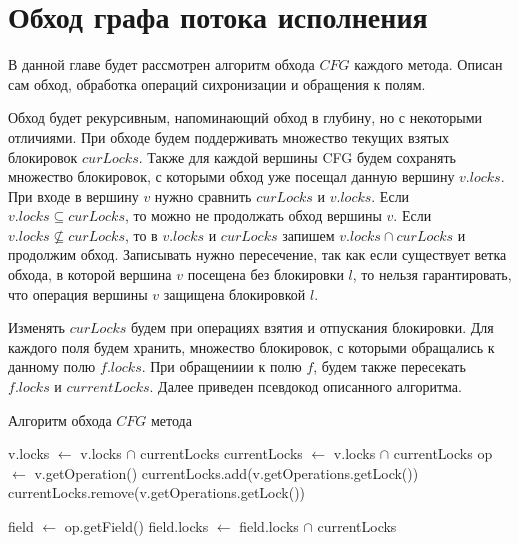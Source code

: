 \section{Обход графа потока исполнения}
В данной главе будет рассмотрен алгоритм обхода $CFG$ каждого метода. Описан сам обход, обработка операций сихронизации и обращения к полям. 

Обход будет рекурсивным, напоминающий обход в глубину, но с некоторыми отличиями. При обходе будем поддерживать множество текущих взятых блокировок $curLocks$. Также для каждой вершины CFG будем сохранять множество блокировок, с которыми обход уже посещал данную вершину $v.locks$.
При входе в вершину $v$ нужно сравнить $curLocks$ и $v.locks$. Если $v.locks \subseteq curLocks$, то можно не продолжать обход вершины $v$. Если $v.locks \nsubseteq curLocks$, то в $v.locks$ и $curLocks$ запишем  $v.locks \cap curLocks$ и продолжим обход. Записывать нужно пересечение, так как если существует ветка обхода, в которой вершина $v$ посещена без блокировки $l$, то нельзя гарантировать, что операция вершины $v$ защищена блокировкой $l$. 

Изменять $curLocks$ будем при операциях взятия и отпускания блокировки. Для каждого поля будем хранить, множество блокировок, с которыми обращались к данному полю $f.locks$. При обращениии к полю $f$, будем также пересекать $f.locks$ и 
$currentLocks$.
Далее приведен псевдокод описанного алгоритма.

\begin{algorithm}
\caption{Алгоритм обхода $CFG$ метода}\label{alg:TraverseCFG}
\begin{algorithmic}
	\State v.locks $\gets$ v.locks $\cap$ currentLocks 
	\State currentLocks $\gets$ v.locks $\cap$ currentLocks 
\EndIf
\State op $\gets$ v.getOperation()
	\State currentLocks.add(v.getOperations.getLock())
\EndIf
{}
	\State currentLocks.remove(v.getOperations.getLock())
\EndIf

	\State field $\gets$ op.getField()
	\State field.locks $\gets$ field.locks $\cap$ currentLocks
\EndIf

	\State {}
\EndFor

\EndFunction
 
\end{algorithmic}
\end{algorithm}

